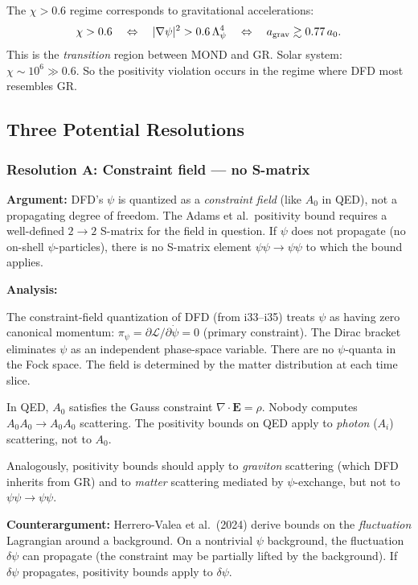 \documentclass[11pt,a4paper]{article}
\begin{document}
The $\chi > 0.6$ regime corresponds to gravitational accelerations:
\begin{equation}
\chi > 0.6 \quad \Leftrightarrow \quad |\nabla\psi|^2 > 0.6\,\Lambda_\psi^4 \quad \Leftrightarrow \quad a_{\rm grav} \gtrsim 0.77\,a_0.
\end{equation}
This is the \emph{transition} region between MOND and GR. Solar system: $\chi \sim 10^6 \gg 0.6$. So the positivity violation occurs in the regime where DFD most resembles GR.

\subsection{Three Potential Resolutions}

\subsubsection{Resolution A: Constraint field --- no S-matrix}

\textbf{Argument:} DFD's $\psi$ is quantized as a \emph{constraint field} (like $A_0$ in QED), not a propagating degree of freedom. The Adams et al.\ positivity bound requires a well-defined $2 \to 2$ S-matrix for the field in question. If $\psi$ does not propagate (no on-shell $\psi$-particles), there is no S-matrix element $\psi\psi \to \psi\psi$ to which the bound applies.

\textbf{Analysis:}

The constraint-field quantization of DFD (from i33--i35) treats $\psi$ as having zero canonical momentum: $\pi_\psi = \partial\mathcal{L}/\partial\dot{\psi} = 0$ (primary constraint). The Dirac bracket eliminates $\psi$ as an independent phase-space variable. There are no $\psi$-quanta in the Fock space. The field is determined by the matter distribution at each time slice.

In QED, $A_0$ satisfies the Gauss constraint $\nabla \cdot \mathbf{E} = \rho$. Nobody computes $A_0 A_0 \to A_0 A_0$ scattering. The positivity bounds on QED apply to \emph{photon} ($A_i$) scattering, not to $A_0$.

Analogously, positivity bounds should apply to \emph{graviton} scattering (which DFD inherits from GR) and to \emph{matter} scattering mediated by $\psi$-exchange, but not to $\psi\psi \to \psi\psi$.

\textbf{Counterargument:} Herrero-Valea et al.\ (2024) derive bounds on the \emph{fluctuation} Lagrangian around a background. On a nontrivial $\psi$ background, the fluctuation $\delta\psi$ can propagate (the constraint may be partially lifted by the background). If $\delta\psi$ propagates, positivity bounds apply to $\delta\psi$.
\end{document}
